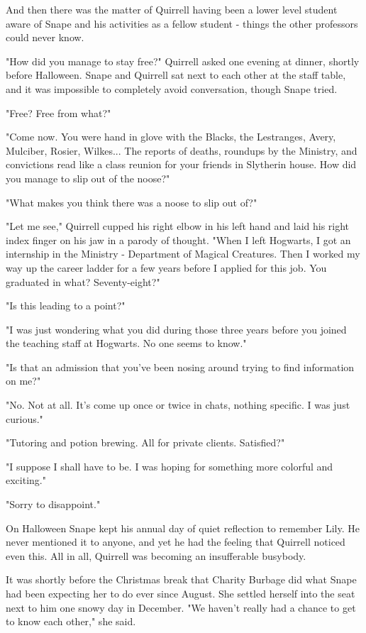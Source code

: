\documentclass[a4paper,11pt]{article}
\begin{document}
And then there was the matter of Quirrell having been a lower level student aware of Snape and his activities as a fellow student - things the other professors could never know.

"How did you manage to stay free?" Quirrell asked one evening at dinner, shortly before Halloween. Snape and Quirrell sat next to each other at the staff table, and it was impossible to completely avoid conversation, though Snape tried.

"Free? Free from what?"

"Come now. You were hand in glove with the Blacks, the Lestranges, Avery, Mulciber, Rosier, Wilkes... The reports of deaths, roundups by the Ministry, and convictions read like a class reunion for your friends in Slytherin house. How did you manage to slip out of the noose?"

"What makes you think there was a noose to slip out of?"

"Let me see," Quirrell cupped his right elbow in his left hand and laid his right index finger on his jaw in a parody of thought. "When I left Hogwarts, I got an internship in the Ministry - Department of Magical Creatures. Then I worked my way up the career ladder for a few years before I applied for this job. You graduated in what? Seventy-eight?"

"Is this leading to a point?"

"I was just wondering what you did during those three years before you joined the teaching staff at Hogwarts. No one seems to know."

"Is that an admission that you've been nosing around trying to find information on me?"

"No. Not at all. It's come up once or twice in chats, nothing specific. I was just curious."

"Tutoring and potion brewing. All for private clients. Satisfied?"

"I suppose I shall have to be. I was hoping for something more colorful and exciting."

"Sorry to disappoint."

On Halloween Snape kept his annual day of quiet reflection to remember Lily. He never mentioned it to anyone, and yet he had the feeling that Quirrell noticed even this. All in all, Quirrell was becoming an insufferable busybody.

It was shortly before the Christmas break that Charity Burbage did what Snape had been expecting her to do ever since August. She settled herself into the seat next to him one snowy day in December. "We haven't really had a chance to get to know each other," she said.
\end{document}

